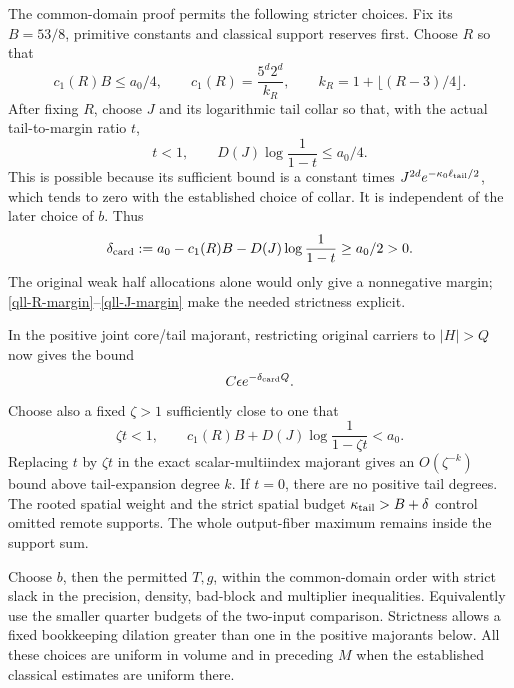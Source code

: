 The common-domain proof permits the following stricter choices.
Fix its \(B=53/8\), primitive constants and classical support
reserves first. Choose \(R\) so that
\begin{equation}
 c_1(R)B\le a_0/4,
 \qquad c_1(R)=\frac{5^d2^d}{k_R},
 \qquad k_R=1+\lfloor(R-3)/4\rfloor .
 \label{qll-R-margin}
\end{equation}
After fixing \(R\), choose \(J\) and its logarithmic tail
collar so that, with the actual tail-to-margin ratio \(t\),
\begin{equation}
 t<1,\qquad
 D(J)\log\frac1{1-t}\le a_0/4.
 \label{qll-J-margin}
\end{equation}
This is possible because its sufficient bound is a constant
times \(J^{2d}e^{-\kappa_0\ell_{\rm tail}/2}\), which tends
to zero with the established choice of collar. It is independent
of the later choice of \(b\). Thus
\begin{equation}
 \delta_{\rm card}
   :=a_0-c_1(R)B-D(J)\log\frac1{1-t}
   \ge a_0/2>0.
 \label{qll-card-margin}
\end{equation}
The original weak half allocations alone would only give a
nonnegative margin; \eqref{qll-R-margin}--\eqref{qll-J-margin}
make the needed strictness explicit.

In the positive joint core/tail majorant, restricting original
carriers to \(|H|>Q\) now gives the bound
\begin{equation}
 C\epsilon e^{-\delta_{\rm card}Q}.
 \label{qll-input-carrier-tail}
\end{equation}
Choose also a fixed \(\zeta>1\) sufficiently close to one that
\begin{equation}
 \zeta t<1,\qquad
 c_1(R)B+D(J)\log\frac1{1-\zeta t}<a_0.
 \label{qll-tail-degree-margin}
\end{equation}
Replacing \(t\) by \(\zeta t\) in the exact scalar-multiindex
majorant gives an \(O(\zeta^{-k})\) bound above tail-expansion
degree \(k\). If \(t=0\), there are no positive tail degrees.
The rooted spatial weight and the strict spatial budget
\(\kappa_{\rm tail}>B+\delta\) control omitted remote supports.
The whole output-fiber maximum remains inside the support sum.

Choose \(b\), then the permitted \(T,g\), within the common-domain
order with strict slack in the precision, density, bad-block
and multiplier inequalities. Equivalently use the smaller
quarter budgets of the two-input comparison. Strictness allows
a fixed bookkeeping dilation greater than one in the positive
majorants below. All these choices are uniform in volume and
in preceding \(M\) when the established classical estimates
are uniform there.

